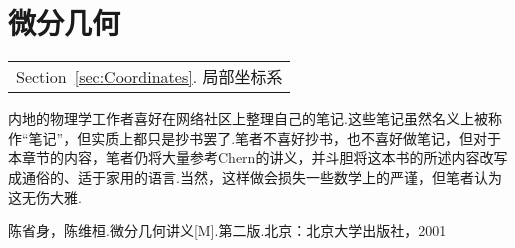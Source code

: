 \part{微分几何}\label{Part:Differential_Geometry}
	\begin{margintable}\vspace{1.4in}\footnotesize
		\begin{tabularx}{\marginparwidth}{|X}
			Section~\ref{sec:Coordinates}. 局部坐标系\\
		\end{tabularx}
	\end{margintable}
	内地的物理学工作者喜好在网络社区上整理自己的笔记.这些笔记虽然名义上被称作“笔记”，但实质上都只是抄书罢了.笔者不喜好抄书，也不喜好做笔记，但对于本章节的内容，笔者仍将大量参考Chern的讲义，并斗胆将这本书的所述内容改写成通俗的、适于家用的语言.当然，这样做会损失一些数学上的严谨，但笔者认为这无伤大雅.

	
	\begin{thebibliography}{9}%
	陈省身，陈维桓.微分几何讲义[M].第二版.北京：北京大学出版社，2001
	\end{thebibliography}